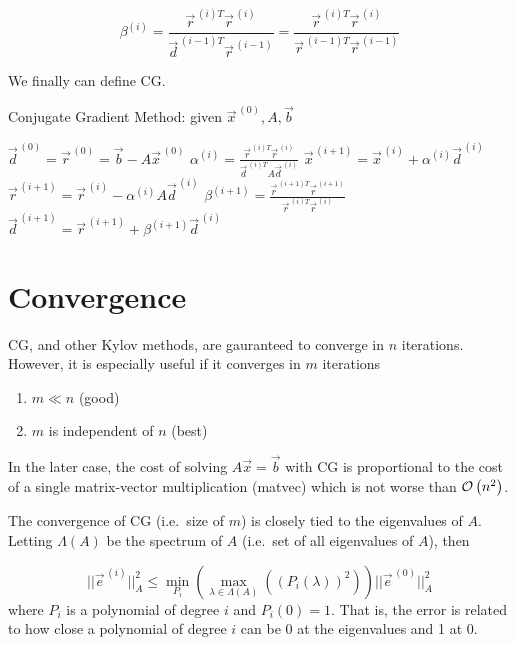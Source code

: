 \begin{equation*}
    \beta^{(i)} =
    \frac{\vec{r}^{\,(i)T}\vec{r}^{\,(i)}}
        {\vec{d}^{\,(i-1)T}\vec{r}^{\,(i-1)}}
        =
    \frac{\vec{r}^{\,(i)T}\vec{r}^{\,(i)}}
        {\vec{r}^{\,(i-1)T}\vec{r}^{\,(i-1)}}
\end{equation*}

We finally can define CG.

\begin{algorithm}
    \caption{Conjugate Gradient Method: given $\vec{x}^{\,(0)}, A, \vec{b}$}
\begin{algorithmic}
    \STATE $\vec{d}^{\,(0)} = \vec{r}^{\,(0)} =\vec{b}- A \vec{x}^{\,(0)}  $
        \STATE $\alpha^{(i)}=\frac{\vec{r}^{\,(i)T}\vec{r}^{\,(i)}}
        {\vec{d}^{\,(i)T}A\vec{d}^{\,(i)}}$
        \STATE $\vec{x}^{\,(i+1)} = \vec{x}^{\,(i)} + \alpha^{(i)}\vec{d}^{\,(i)}$
        \STATE $\vec{r}^{\,(i+1)} = \vec{r}^{\,(i)} - \alpha^{(i)}A\vec{d}^{\,(i)}$
        \STATE $\beta^{(i+1)} = \frac{\vec{r}^{\,(i+1)T}\vec{r}^{\,(i+1)}} {\vec{r}^{\,(i)T}\vec{r}^{\,(i)}}$
        \STATE $\vec{d}^{\,(i+1)} = \vec{r}^{\,(i+1)} + \beta^{(i+1)}\vec{d}^{\,(i)}$
    \ENDFOR
\end{algorithmic}
\end{algorithm}


\section*{Convergence}
CG, and other Kylov methods, are gauranteed to converge in $n$ iterations. However, it is especially useful if it converges in $m$ iterations

\begin{enumerate}[1)]
    \item $m\ll n$ \qquad (good)
    \item $m$ is independent of $n$ (best)
\end{enumerate}

In the later case, the cost of solving $A\vec{x} = \vec{b}$ with CG is proportional to the cost of a single matrix-vector multiplication (matvec) which is not worse than $\mathcal{O}\left(n^2\right)$.

The convergence of CG (i.e.\ size of $m$) is closely tied to the eigenvalues of $A$. Letting $\Lambda(A)$ be the spectrum of $A$ (i.e.\ set of all eigenvalues of $A$), then

\begin{equation*}
    \lvert\lvert \vec{e}^{\,(i)} \rvert\rvert^{2}_{A} \leq
    \min_{P_i} \left(
    \max_{\lambda \in \Lambda(A)}
    \left(
    (P_i(\lambda))^2
    \right)
    \right)
    \lvert\lvert \vec{e}^{\,(0)} \rvert\rvert^{2}_{A}
\end{equation*}
where $P_i$ is a polynomial of degree $i$ and $P_i(0)=1$. That is, the error is related to how close a polynomial of degree $i$ can be 0 at the eigenvalues and 1 at 0.

